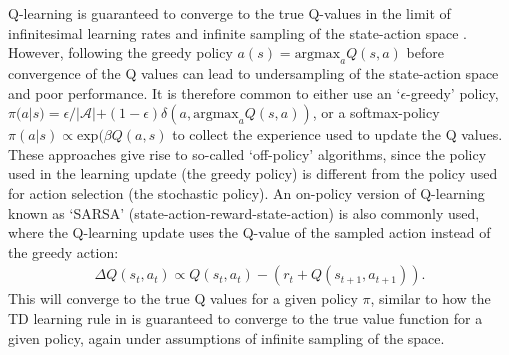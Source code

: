 Q-learning is guaranteed to converge to the true Q-values in the limit of infinitesimal learning rates and infinite sampling of the state-action space \citep{watkins1992q,sutton2018reinforcement}.
However, following the greedy policy $a(s) = \text{argmax}_{a} Q(s, a)$ before convergence of the Q values can lead to undersampling of the state-action space and poor performance.
It is therefore common to either use an `$\epsilon$-greedy' policy, $\pi(a|s) = \epsilon / |\mathcal{A}| + (1-\epsilon) \delta(a, \text{argmax}_{a} Q(s, a))$, or a softmax-policy $\pi(a|s) \propto \text{exp}(\beta Q(a, s)$ to collect the experience used to update the Q values.
These approaches give rise to so-called `off-policy' algorithms, since the policy used in the learning update (the greedy policy) is different from the policy used for action selection (the stochastic policy).
An on-policy version of Q-learning known as `SARSA' (state-action-reward-state-action) is also commonly used, where the Q-learning update uses the Q-value of the sampled action instead of the greedy action:
\begin{align}
    \Delta  Q(s_t,a_t) \propto Q(s_t,a_t) - (r_t + Q(s_{t+1}, a_{t+1})).
\end{align}
This will converge to the true Q values for a given policy $\pi$, similar to how the TD learning rule in  is guaranteed to converge to the true value function for a given policy, again under assumptions of infinite sampling of the space.


